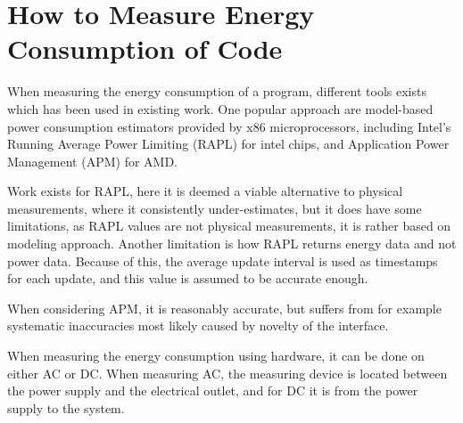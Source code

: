 
\section{How to Measure Energy Consumption of Code}

When measuring the energy consumption of a program, different tools exists which has been used in existing work. One popular approach are model-based power consumption estimators provided by x86 microprocessors, including Intel's Running Average Power Limiting (RAPL) for intel chips, and Application Power Management (APM) for AMD.

Work exists for RAPL, here it is deemed a viable alternative to physical measurements, where it consistently under-estimates\cite[]{Dongarra2012, Hackenberg2013}, but it does have some limitations, as RAPL values are not physical measurements, it is rather based on modeling approach\cite[]{Hackenberg2013}. Another limitation is how RAPL returns energy data and not power data. Because of this, the average update interval is used as timestamps for each update, and this value is assumed to be accurate enough.\cite[]{Hackenberg2013}

When considering APM, it is reasonably accurate, but suffers from for example systematic inaccuracies most likely caused by novelty of the interface.\cite[]{Hackenberg2013}


When measuring the energy consumption using hardware, it can be done on either AC or DC. When measuring AC, the measuring device is located between the power supply and the electrical outlet, and for DC it is from the power supply to the system.\cite*[]{Hackenberg2013}


